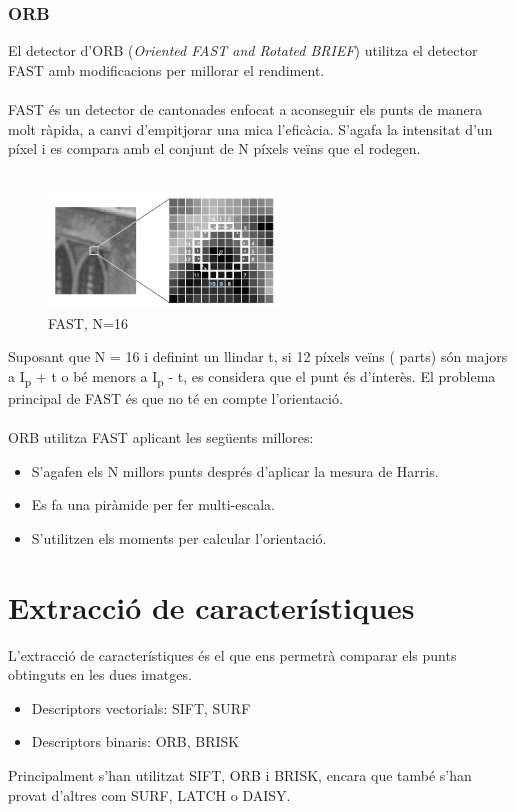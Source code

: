 	\subsubsection{ORB}
	El detector d'ORB (\textit{Oriented FAST and Rotated BRIEF}) utilitza el detector FAST amb modificacions per millorar el rendiment.\\\\
	FAST és un detector de cantonades enfocat a aconseguir els punts de manera molt ràpida, a canvi d'empitjorar una mica l'eficàcia. S'agafa la intensitat d'un píxel i es compara amb el conjunt
	de N píxels veïns que el rodegen.\\\\
	\begin{figure}[H]
		\centering
		\includegraphics[width=0.55\textwidth]{images/fast}
		\caption{FAST, N=16}
	\end{figure}
	\noindent
	Suposant que N = 16 i definint un llindar t, si 12 píxels veïns ( parts) són majors a I\textsubscript{p} + t o bé menors a I\textsubscript{p} - t, es considera que el punt és d'interès.
	El problema principal de FAST és que no té en compte l'orientació.\\\\
	ORB utilitza FAST aplicant les següents millores:\\
	\begin{itemize}
		\item{S'agafen els N millors punts després d'aplicar la mesura de Harris.}
		\item{Es fa una piràmide per fer multi-escala.}
		\item{S'utilitzen els moments per calcular l'orientació.}
	\end{itemize}

\section{Extracció de característiques}

	L'extracció de característiques és el que ens permetrà comparar els punts obtinguts en les dues imatges.\\
	\begin{itemize}
		\item{Descriptors vectorials: SIFT, SURF}
		\item{Descriptors binaris: ORB, BRISK\\}
	\end{itemize}
	Principalment s'han utilitzat SIFT, ORB i BRISK, encara que també s'han provat d'altres com SURF, LATCH o DAISY.

